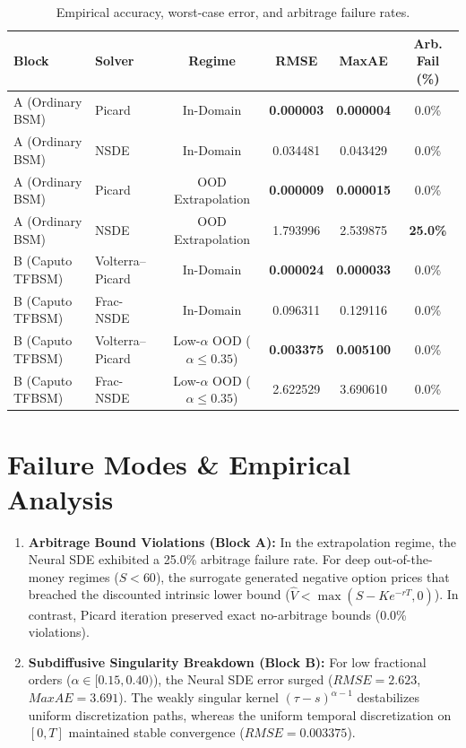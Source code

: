 \documentclass[10pt,twocolumn,a4paper]{article}
\begin{document}
\begin{table}[h]
\centering
\small
\begin{tabular}{@{}llcccc@{}}
\toprule
\textbf{Block} & \textbf{Solver} & \textbf{Regime} & \textbf{RMSE} & \textbf{MaxAE} & \textbf{Arb. Fail (\%)} \\ \midrule
A (Ordinary BSM) & Picard & In-Domain & \textbf{0.000003} & \textbf{0.000004} & 0.0\% \\
A (Ordinary BSM) & NSDE & In-Domain & 0.034481 & 0.043429 & 0.0\% \\
A (Ordinary BSM) & Picard & OOD Extrapolation & \textbf{0.000009} & \textbf{0.000015} & 0.0\% \\
A (Ordinary BSM) & NSDE & OOD Extrapolation & 1.793996 & 2.539875 & \textbf{25.0\%} \\ \midrule
B (Caputo TFBSM) & Volterra--Picard & In-Domain & \textbf{0.000024} & \textbf{0.000033} & 0.0\% \\
B (Caputo TFBSM) & Frac-NSDE & In-Domain & 0.096311 & 0.129116 & 0.0\% \\
B (Caputo TFBSM) & Volterra--Picard & Low-$\alpha$ OOD ($\alpha \le 0.35$) & \textbf{0.003375} & \textbf{0.005100} & 0.0\% \\
B (Caputo TFBSM) & Frac-NSDE & Low-$\alpha$ OOD ($\alpha \le 0.35$) & 2.622529 & 3.690610 & 0.0\% \\ \bottomrule
\end{tabular}
\caption{Empirical accuracy, worst-case error, and arbitrage failure rates.}
\end{table}

\section{Failure Modes \& Empirical Analysis}
\begin{enumerate}
    \item \textbf{Arbitrage Bound Violations (Block A):} In the extrapolation regime, the Neural SDE exhibited a 25.0\% arbitrage failure rate. For deep out-of-the-money regimes ($S < 60$), the surrogate generated negative option prices that breached the discounted intrinsic lower bound ($\hat{V} < \max(S - K e^{-rT}, 0)$). In contrast, Picard iteration preserved exact no-arbitrage bounds (0.0\% violations).
    \item \textbf{Subdiffusive Singularity Breakdown (Block B):} For low fractional orders ($\alpha \in [0.15, 0.40)$), the Neural SDE error surged ($RMSE = 2.623$, $MaxAE = 3.691$). The weakly singular kernel $(\tau - s)^{\alpha - 1}$ destabilizes uniform discretization paths, whereas the uniform temporal discretization on $[0, T]$ maintained stable convergence ($RMSE = 0.003375$).
\end{enumerate}
\end{document}
